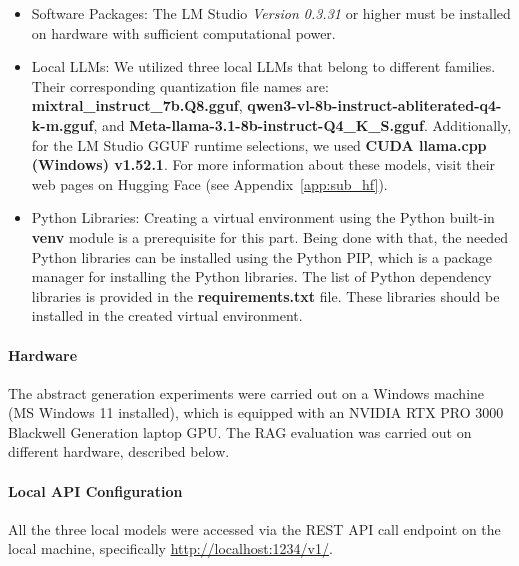 \documentclass[bdcc,article,submit,pdftex,moreauthors]{Definitions/mdpi}
\begin{document}
\begin{itemize}
\item	Software Packages: The LM Studio \textit{Version 0.3.31} or higher must be installed on hardware with sufficient computational power.

\item	Local LLMs: We utilized three local LLMs that belong to different families. Their corresponding quantization file names are: \textbf{mixtral\_instruct\_7b.Q8.gguf}, \textbf{qwen3-vl-8b-instruct-abliterated-q4-k-m.gguf}, and \textbf{Meta-llama-3.1-8b-instruct-Q4\_K\_S.gguf}. Additionally, for the LM Studio GGUF runtime selections, we used \textbf{CUDA llama.cpp (Windows) v1.52.1}. For more information about these models, visit their web pages on Hugging Face (see Appendix~\ref{app:sub_hf}). %

\item	Python Libraries: Creating a virtual environment using the Python built-in \textbf{venv} module is a prerequisite for this part. Being done with that, the needed Python libraries can be installed using the Python PIP, which is a package manager for installing the Python libraries. %
The list of Python dependency libraries is provided in the \textbf{requirements.txt} file. These libraries should be installed in the created virtual environment.
\end{itemize}

\paragraph{Hardware}
The abstract generation experiments were carried out on a Windows machine (MS Windows 11 installed), which is equipped with an NVIDIA RTX PRO 3000 Blackwell Generation laptop GPU. The RAG evaluation was carried out on different hardware, described below.

\paragraph{Local API Configuration}
All the three local models were accessed via the REST API call endpoint on the local machine, specifically \url{http://localhost:1234/v1/}.
\end{document}
